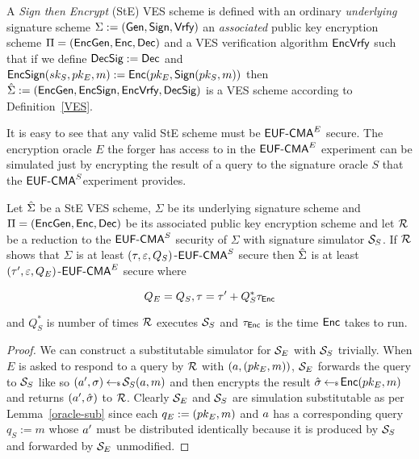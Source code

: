 \begin{definition}
A \emph{Sign then Encrypt} (StE) VES scheme is defined with an ordinary \emph{underlying} signature scheme $\Sigma := (\textsf{Gen}, \textsf{Sign}, \textsf{Vrfy})$ an \emph{associated} public key encryption scheme $\Pi = (\textsf{EncGen}, \textsf{Enc}, \textsf{Dec})$ and a VES verification algorithm $\textsf{EncVrfy}$ such that if we define $\textsf{DecSig} := \textsf{Dec}$ and $\textsf{EncSign}(sk_S, pk_E, m) := \textsf{Enc}(pk_E, \textsf{Sign}(pk_S, m))$ then $\hat{\Sigma} := (\textsf{EncGen}, \textsf{EncSign}, \textsf{EncVrfy}, \textsf{DecSig})$ is a VES scheme according to Definition~\ref{VES}.
\end{definition}

It is easy to see that any valid StE scheme must be $\textsf{EUF-CMA}^E$ secure.
The encryption oracle $E$ the forger has access to in the $\textsf{EUF-CMA}^E$ experiment can be simulated just by encrypting the result of a query to the signature oracle $S$ that the $\textsf{EUF-CMA}^S $experiment provides.

\begin{theorem}
  Let $\hat{\Sigma}$ be a StE VES scheme,  $\Sigma$ be its underlying signature scheme and $\Pi = (\textsf{EncGen}, \textsf{Enc}, \textsf{Dec})$ be its associated public key encryption scheme and let $\mathcal{R}$ be a reduction to the $\textsf{EUF-CMA}^S$ security of $\Sigma$ with signature simulator $\mathcal{S}_S$.
  If $\mathcal{R}$ shows that $\Sigma$ is at least $(\tau, \varepsilon, Q_S)$-$\textsf{EUF-CMA}^S$ secure then $\hat{\Sigma}$ is at least $(\tau', \varepsilon, Q_E)$-$\textsf{EUF-CMA}^E$ secure where

  \[ Q_E = Q_S, \tau = \tau' + Q^*_S\tau_{\textsf{Enc}} \]

  \hfill \break and $Q^*_S$ is number of times $\mathcal{R}$ executes $\mathcal{S}_S$ and $\tau_{\textsf{Enc}}$ is the time $\textsf{Enc}$ takes to run.
\end{theorem}

\begin{proof}
  We can construct a substitutable simulator for $\mathcal{S}_E$ with $\mathcal{S}_S$ trivially.
  When $E$ is asked to respond to a query by $\mathcal{R}$ with $(a, (pk_E, m))$, $\mathcal{S}_E$ forwards the query to $\mathcal{S}_S$ like so $(a', \sigma) \hskip2.3pt{\gets\!\!\mbox{\tiny${\$}$\normalsize}}\, \mathcal{S}_S(a, m)$
  and then encrypts the result $\hat{\sigma} \hskip2.3pt{\gets\!\!\mbox{\tiny${\$}$\normalsize}}\, \textsf{Enc}(pk_E, m)$ and returns $(a', \hat{\sigma})$ to $\mathcal{R}$.
  Clearly $\mathcal{S}_E$ and $\mathcal{S}_S$ are simulation substitutable as per Lemma~\ref{oracle-sub} since each $q_E := (pk_E, m)$ and $a$ has a corresponding query $q_S := m$ whose $a'$ must be distributed identically because it is produced by $\mathcal{S}_S$ and forwarded by $\mathcal{S}_E$ unmodified.
\end{proof}
